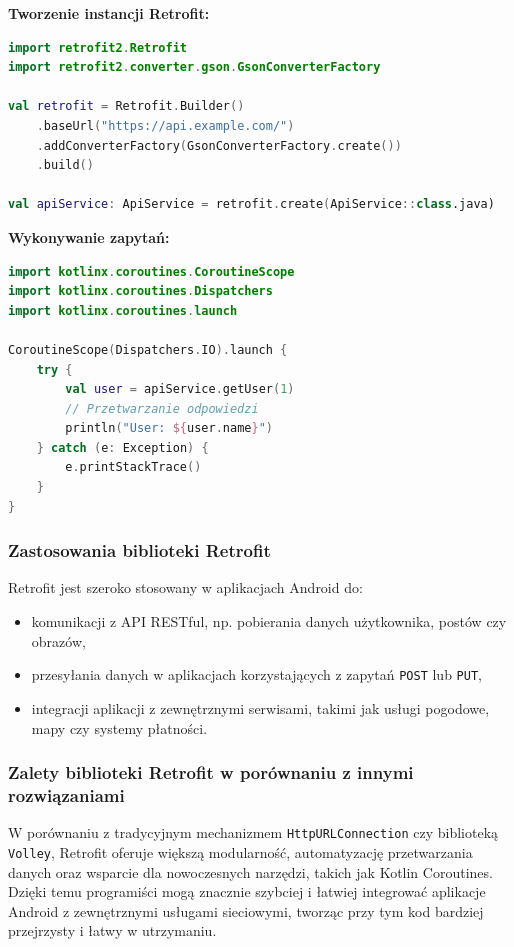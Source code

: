 \documentclass[12pt]{article}
\begin{document}
\textbf{Tworzenie instancji Retrofit:}
\begin{lstlisting}[language=Kotlin]
import retrofit2.Retrofit
import retrofit2.converter.gson.GsonConverterFactory

val retrofit = Retrofit.Builder()
	.baseUrl("https://api.example.com/")
	.addConverterFactory(GsonConverterFactory.create())
	.build()

val apiService: ApiService = retrofit.create(ApiService::class.java)
\end{lstlisting}

\clearpage
\textbf{Wykonywanie zapytań:}
\begin{lstlisting}[language=Kotlin]
import kotlinx.coroutines.CoroutineScope
import kotlinx.coroutines.Dispatchers
import kotlinx.coroutines.launch

CoroutineScope(Dispatchers.IO).launch {
	try {
		val user = apiService.getUser(1)
		// Przetwarzanie odpowiedzi
		println("User: ${user.name}")
	} catch (e: Exception) {
		e.printStackTrace()
	}
}
\end{lstlisting}

\subsubsection*{Zastosowania biblioteki Retrofit}
\noindent Retrofit jest szeroko stosowany w aplikacjach Android do:
\begin{itemize}
    \item komunikacji z API RESTful, np. pobierania danych użytkownika, postów czy obrazów,
    \item przesyłania danych w aplikacjach korzystających z zapytań \texttt{POST} lub \texttt{PUT},
    \item integracji aplikacji z zewnętrznymi serwisami, takimi jak usługi pogodowe, mapy czy systemy płatności.
\end{itemize}

\subsubsection*{Zalety biblioteki Retrofit w porównaniu z innymi rozwiązaniami}
\noindent W porównaniu z tradycyjnym mechanizmem \texttt{HttpURLConnection} czy biblioteką \texttt{Volley}, Retrofit oferuje większą modularność,
automatyzację przetwarzania danych oraz wsparcie dla nowoczesnych narzędzi, takich jak Kotlin Coroutines. Dzięki temu programiści mogą znacznie szybciej
i łatwiej integrować aplikacje Android z zewnętrznymi usługami sieciowymi, tworząc przy tym kod bardziej przejrzysty i łatwy w utrzymaniu.
\end{document}

